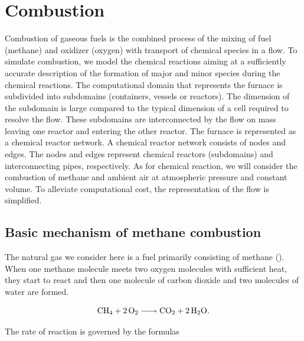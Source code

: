 \chapter{Combustion} \label{ch:combustion}

Combustion of gaseous fuels is the combined process of the mixing of fuel (methane) and oxidizer (oxygen) with transport of chemical species in a flow. To simulate combustion, we model the chemical reactions aiming at a sufficiently accurate description of the formation of major and minor species during the chemical reactions. The computational domain that represents the furnace is subdivided into subdomains (containers, vessels or reactors). The dimension of the subdomain is large compared to the typical dimension of a cell required to resolve the flow. These subdomains are interconnected by the flow on mass leaving one reactor and entering the other reactor. The furnace is represented as a chemical reactor network. A chemical reactor network consists of nodes and edges. The nodes and edges represent chemical reactors (subdomains) and interconnecting pipes, respectively. As for chemical reaction, we will consider the combustion of methane and ambient air at atmospheric pressure and constant volume. To alleviate computational cost, the representation of the flow is simplified. 

\section{Basic mechanism of methane combustion} \label{sec:methane_mechanism}

The natural gas we consider here is a fuel primarily consisting of methane (). When one methane molecule meets two oxygen molecules with sufficient heat, they start to react and then one molecule of carbon dioxide and two molecules of water are formed.

\begin{equation} \label{re:one-step}
    \ce{CH4 + 2 O2 -> CO2 + 2 H2O}.
\end{equation}

The rate of reaction is governed by the formulas

